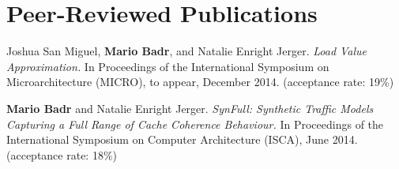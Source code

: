 \section{\sc Peer-Reviewed Publications}

\begin{samepage}
  Joshua San Miguel, \textbf{Mario Badr}, and Natalie Enright Jerger.
  \textit{Load Value Approximation.}
  In Proceedings of the International Symposium on Microarchitecture (MICRO), to appear, December 2014.
  (acceptance rate: 19\%)
\end{samepage}

\begin{samepage}
  \textbf{Mario Badr} and Natalie Enright Jerger.
  \textit{SynFull: Synthetic Traffic Models Capturing a Full Range of Cache Coherence Behaviour.}
  In Proceedings of the International Symposium on Computer Architecture (ISCA), June 2014.
  (acceptance rate: 18\%)
\end{samepage}
